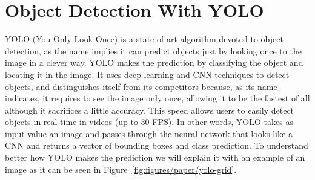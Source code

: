 \chapter[Object Detection With YOLO]{Object Detection With YOLO}

\regularsection
\headerregularsection

\updatemylof %

\begin{sloppypar} %



  YOLO (You Only Look Once) is a state-of-art algorithm devoted to object detection, as the name
  implies it can predict objects just by looking once to the image in a clever way. YOLO makes the
  prediction by classifying the object and locating it in the image. It uses deep learning and CNN
  techniques to detect objects, and distinguishes itself from its competitors because, as its name
  indicates, it requires to see the image only once, allowing it to be the fastest of all although it
  sacrifices a little accuracy. This speed allows users to easily detect objects in real time in videos
  (up to 30 FPS). In other words, YOLO takes as input value an image and passes through the neural
  network that looks like a CNN and returns a vector of bounding boxes and class prediction. To
  understand  better  how  YOLO  makes  the  prediction  we  will  explain  it  with  an  example  of  an
  image as it can be seen in Figure~\ref{fig:figures/paper/yolo-grid}.


\end{sloppypar}
